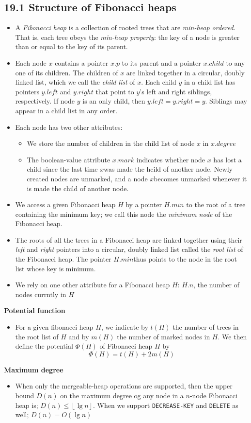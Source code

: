 \documentclass{report}
\begin{document}
\subsection*{19.1 Structure of Fibonacci heaps}
\begin{itemize}
    \item A \textit{Fibonacci heap} is a collection of rooted trees that are \textit{min-heap ordered}. That is, each tree obeys the \textit{min-heap property}: the key of a node is greater than or equal to the key of its parent.
    \item Each node $x$ contains a pointer $x.p$ to its parent and a pointer $x.child$ to any one of its children. The children of $x$ are linked together in a circular, doubly linked list, which we call the \textit{child list} of $x$. Each child $y$ in a child list has pointers $y.left$ and $y.right$ that point to $y$'s left and right siblings, respectively. If node $y$ is an only child, then $y.left = y.right = y$. Siblings may appear in a child list in any order.
    \item Each node has two other attributes:
    \begin{itemize}
        \item We store the number of children in the child list of node $x$ in $x.degree$
        \item The boolean-value attribute $x.mark$ indicates whether node $x$ has lost a child since the last time $x$was made the hcild of another node. Newly created nodes are unmarked, and a node $x$becomes unmarked whenever it is made the child of another node.
    \end{itemize}
    \item We access a given Fibonacci heap $H$ by a pointer $H.min$ to the root of a tree containing the minimum key; we call this node the \textit{minimum node} of the Fibonacci heap.
    \item The roots of all the trees in a Fibonacci heap are linked together using their \textit{left} and \textit{right} pointers into a circular, doubly linked list called the \textit{root list} of the Fibonacci heap. The pointer $H.min$thus points to the node in the root list whose key is minimum.
    \item We rely on one other attribute for a Fibonacci heap $H$: $H.n$, the number of nodes currntly in $H$
\end{itemize}
\textbf{Potential function}
\begin{itemize}
    \item For a given fibonacci heap $H$, we indicate by $t(H)$ the number of trees in the root list of $H$ and by $m(H)$ the number of marked nodes in $H$. We then define the potential $\Phi(H)$ of Fibonacci heap $H$ by
    $$\Phi(H) = t(H) + 2m(H)$$
\end{itemize}
\textbf{Maximum degree}
\begin{itemize}
    \item When only the mergeable-heap operations are supported, then the upper bound $D(n)$ on the maximum degree og any node in a $n$-node Fibonacci heap is; $D(n) \leq \left \lfloor{\lg n}\right \rfloor$. When we support \texttt{DECREASE-KEY} and \texttt{DELETE} as well; $D(n) = O(\lg n)$
\end{itemize}
\end{document}
